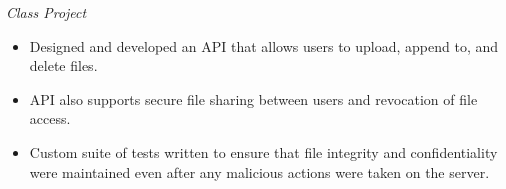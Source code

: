 \documentclass{article}
\begin{document}
\begin{adjustwidth}{1em}{1em}
    \textit{Class Project}
    \begin{itemize}
        \item Designed and developed an API that allows users to upload, append to, and delete files.
        \item API also supports secure file sharing between users and revocation of file access.
        \item Custom suite of tests written to ensure that file integrity and confidentiality were maintained even after any malicious actions were taken on the server.
    \end{itemize}

    \vspace{1mm}




    


\end{adjustwidth}


\end{document}
